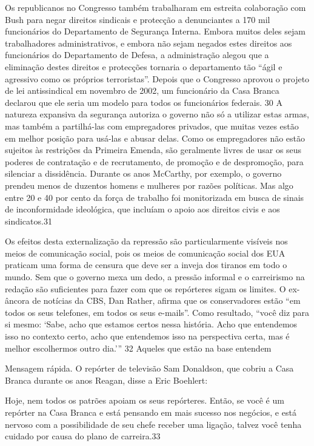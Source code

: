 Os republicanos no Congresso também trabalharam em estreita colaboração com Bush para negar direitos sindicais e protecção a denunciantes a {\color{blue}170} mil funcionários do Departamento de Segurança Interna. Embora muitos deles sejam trabalhadores administrativos, e embora não sejam negados estes direitos aos funcionários do Departamento de Defesa, a administração alegou que a eliminação destes direitos e protecções tornaria o departamento tão “ágil e agressivo como os próprios terroristas”. Depois que o Congresso aprovou o projeto de lei antissindical em novembro de 2002, um funcionário da Casa Branca declarou que ele seria um modelo para todos os funcionários federais. {\color{blue}30} A natureza expansiva da segurança autoriza o governo não só a utilizar estas armas, mas também a partilhá-las com empregadores privados, que muitas vezes estão em melhor posição para usá-las e abusar delas. Como os empregadores não estão sujeitos às restrições da Primeira Emenda, são geralmente livres de usar os seus poderes de contratação e de recrutamento, de promoção e de despromoção, para silenciar a dissidência. Durante os anos McCarthy, por exemplo, o governo prendeu menos de duzentos homens e mulheres por razões políticas. Mas algo entre {\color{blue}20} e {\color{blue}40} por cento da força de trabalho foi monitorizada em busca de sinais de inconformidade ideológica, que incluíam o apoio aos direitos civis e aos sindicatos.{\color{blue}31}
 \par 
Os efeitos desta externalização da repressão são particularmente visíveis nos meios de comunicação social, pois os meios de comunicação social dos EUA praticam uma forma de censura que deve ser a inveja dos tiranos em todo o mundo. Sem que o governo mexa um dedo, a pressão informal e o carreirismo na redação são suficientes para fazer com que os repórteres sigam os limites. O ex-âncora de notícias da CBS, Dan Rather, afirma que os conservadores estão “em todos os seus telefones, em todos os seus e-mails”. Como resultado, “você diz para si mesmo: ‘Sabe, acho que estamos certos nessa história. Acho que entendemos isso no contexto certo, acho que entendemos isso na perspectiva certa, mas é melhor escolhermos outro dia.’” {\color{blue}32} Aqueles que estão na base entendem
 \par 
Mensagem rápida. O repórter de televisão Sam Donaldson, que cobriu a Casa Branca durante os anos Reagan, disse a Eric Boehlert:
 \par 
Hoje, nem todos os patrões apoiam os seus repórteres. Então, se você é um repórter na Casa Branca e está pensando em mais sucesso nos negócios, e está nervoso com a possibilidade de seu chefe receber uma ligação, talvez você tenha cuidado por causa do plano de carreira.{\color{blue}33}
